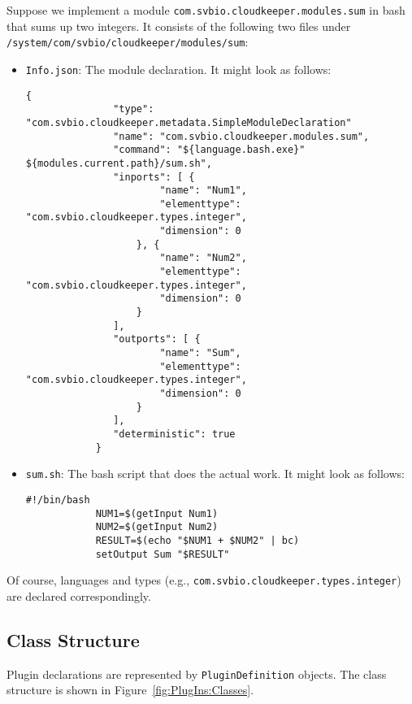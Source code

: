 \begin{example}
Suppose we implement a module \texttt{com.svbio.cloudkeeper.modules.sum} in bash that sums up two integers. It consists of the following two files under \\\texttt{/system/com/svbio/cloudkeeper/modules/sum}:
\begin{itemize}
	\item \texttt{Info.json}: The module declaration. It might look as follows:
		\begin{lstlisting}[gobble=12]
			{
			   "type": "com.svbio.cloudkeeper.metadata.SimpleModuleDeclaration"
			   "name": "com.svbio.cloudkeeper.modules.sum",
			   "command": "${language.bash.exe}" ${modules.current.path}/sum.sh",
			   "inports": [ {
			           "name": "Num1",
			           "elementtype": "com.svbio.cloudkeeper.types.integer",
			           "dimension": 0
			       }, {
			           "name": "Num2",
			           "elementtype": "com.svbio.cloudkeeper.types.integer",
			           "dimension": 0
			       }
			   ],
			   "outports": [ {
			           "name": "Sum",
			           "elementtype": "com.svbio.cloudkeeper.types.integer",
			           "dimension": 0
			       }
			   ],
			   "deterministic": true
			}
		\end{lstlisting}
	\item \texttt{sum.sh}: The bash script that does the actual work. It might look as follows:
		\begin{lstlisting}[gobble=12]
			#!/bin/bash
			NUM1=$(getInput Num1)
			NUM2=$(getInput Num2)
			RESULT=$(echo "$NUM1 + $NUM2" | bc)
			setOutput Sum "$RESULT"
		\end{lstlisting}
\end{itemize}
Of course, languages and types (e.g., \texttt{com.svbio.cloudkeeper.types.integer}) are declared correspondingly.
\end{example}

\subsection{Class Structure}

Plugin declarations are represented by \texttt{PluginDefinition} objects. The class structure is shown in Figure~\ref{fig:PlugIns:Classes}.


